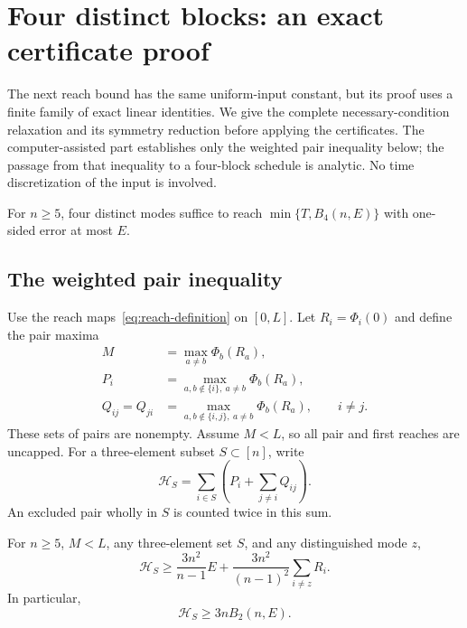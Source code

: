 \section{Four distinct blocks: an exact certificate proof}\label{sec:reach-four}

The next reach bound has the same uniform-input constant, but its proof
uses a finite family of exact linear identities. We give the complete
necessary-condition relaxation and its symmetry reduction before applying
the certificates. The computer-assisted part establishes only the weighted
pair inequality below; the passage from that inequality to a four-block
schedule is analytic. No time discretization of the input is involved.

\begin{theorem}\label{thm:reach-four}
For $n\ge5$, four distinct modes suffice to reach $\min\{T,B_4(n,E)\}$
with one-sided error at most $E$.
\end{theorem}

\subsection{The weighted pair inequality}

Use the reach maps~\eqref{eq:reach-definition} on $[0,L]$. Let
$R_i=\Phi_i(0)$ and define the pair maxima
\begin{equation}\label{eq:pair-exclusions-four}
 \begin{split}
 M&=\max_{a\ne b}\Phi_b(R_a),\\
 P_i&=\max_{a,b\notin\{i\},\ a\ne b}\Phi_b(R_a),\\
 Q_{ij}=Q_{ji}&=
 \max_{a,b\notin\{i,j\},\ a\ne b}\Phi_b(R_a),\qquad i\ne j.
 \end{split}
\end{equation}
These sets of pairs are nonempty. Assume $M<L$, so all pair and first
reaches are uncapped. For a three-element subset $S\subset[n]$, write
\begin{equation}\label{eq:H-S}
 \mathcal H_S=\sum_{i\in S}\left(P_i+\sum_{j\ne i}Q_{ij}\right).
\end{equation}
An excluded pair wholly in $S$ is counted twice in this sum.

\begin{lemma}\label{lem:weighted-pair}
For $n\ge5$, $M<L$, any three-element set $S$, and any distinguished
mode $z$,
\begin{equation}\label{eq:weighted-pair-strong}
 \mathcal H_S\ge \frac{3n^2}{n-1}E
       +\frac{3n^2}{(n-1)^2}\sum_{i\ne z}R_i.
\end{equation}
In particular,
\begin{equation}\label{eq:weighted-pair}
 \mathcal H_S\ge3nB_2(n,E).
\end{equation}
\end{lemma}


